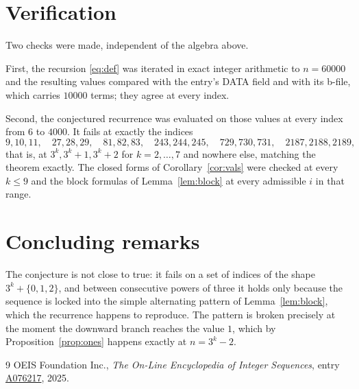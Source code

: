\documentclass[11pt,a4paper]{article}
\theoremstyle{plain}
\theoremstyle{definition}
\begin{document}
\section{Verification}

Two checks were made, independent of the algebra above.

First, the recursion \eqref{eq:def} was iterated in exact integer arithmetic to $n=60000$
and the resulting values compared with the entry's DATA field and with its b-file, which
carries $10000$ terms; they agree at every index.

Second, the conjectured recurrence was evaluated on those values at every index from $6$ to
$4000$. It fails at exactly the indices
\[
9,10,11,\quad 27,28,29,\quad 81,82,83,\quad 243,244,245,\quad 729,730,731,\quad
2187,2188,2189,
\]
that is, at $3^{k},3^{k}+1,3^{k}+2$ for $k=2,\dots,7$ and nowhere else, matching the
theorem exactly. The closed forms of Corollary~\ref{cor:vals} were checked at every
$k\le 9$ and the block formulas of Lemma~\ref{lem:block} at every admissible $i$ in that
range.

\section{Concluding remarks}

The conjecture is not close to true: it fails on a set of indices of the shape
$3^{k}+\{0,1,2\}$, and between consecutive powers of three it holds only because the
sequence is locked into the simple alternating pattern of Lemma~\ref{lem:block}, which the
recurrence happens to reproduce. The pattern is broken precisely at the moment the downward
branch reaches the value $1$, which by Proposition~\ref{prop:ones} happens exactly at
$n=3^{k}-2$.

\begin{thebibliography}{9}
 OEIS Foundation Inc., \emph{The On-Line Encyclopedia of Integer Sequences},
entry \href{https://oeis.org/A076217}{A076217}, 2025.
\end{thebibliography}
\end{document}
